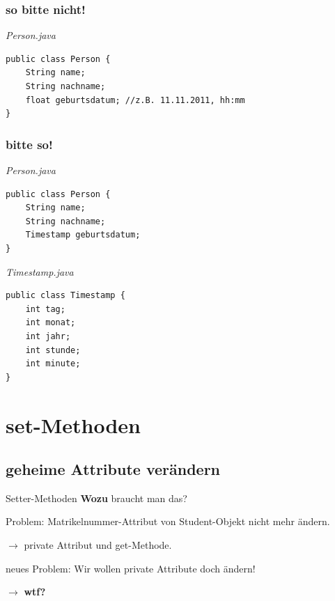 \documentclass[18pt]{beamer}
\begin{document}

\begin{frame}[containsverbatim]
	\frametitle{so bitte nicht!}
	

		\emph{Person.java}
		\begin{lstlisting}
public class Person {
	String name;
	String nachname;
	float geburtsdatum; //z.B. 11.11.2011, hh:mm
}
\end{lstlisting}
\end{frame}


\begin{frame}[containsverbatim]
	\frametitle{bitte so!}
	

		\emph{Person.java}
		\begin{lstlisting}
public class Person {
	String name;
	String nachname;
	Timestamp geburtsdatum;
}
\end{lstlisting}

		\emph{Timestamp.java}
		\begin{lstlisting}
public class Timestamp {
	int tag;
	int monat;
	int jahr;
	int stunde;
	int minute;
}
\end{lstlisting}
\end{frame}


\section{set-Methoden}
\subsection{geheime Attribute verändern}
\begin{frame}{Setter-Methoden}
	\textbf{Wozu} braucht man das?
	\pause
	
	Problem: Matrikelnummer-Attribut von Student-Objekt nicht mehr ändern.
	
	$\rightarrow$ private Attribut und get-Methode.
	
	
	
	\pause neues Problem: Wir wollen private Attribute doch ändern!
	
	\pause $\rightarrow$ \textbf{wtf?}
	
\end{frame}
\end{document}
